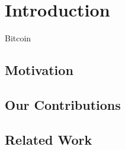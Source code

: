 \chapter{Introduction}\label{chapter:introduction}


Bitcoin \cite{bitcoin}

\section{Motivation}
\section{Our Contributions}
\section{Related Work}

